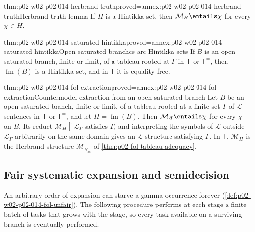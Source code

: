 \begin{hblemma}{thm:p02-w02-p02-014-herbrand-truth}{proved=annex:p02-w02-p02-014-herbrand-truth}{Herbrand truth lemma}
If \(H\) is a Hintikka set, then \(\mathcal M_H\entails\chi\) for every
\(\chi\in H\).
\end{hblemma}

\begin{hblemma}{thm:p02-w02-p02-014-saturated-hintikka}{proved=annex:p02-w02-p02-014-saturated-hintikka}{Open saturated branches are Hintikka sets}
If \(B\) is an open saturated branch, finite or limit, of a tableau rooted at
\(\Gamma\) in \(\mathsf T\) or \(\mathsf T^{=}\), then \(\operatorname{fm}(B)\) is a Hintikka
set, and in \(\mathsf T\) it is equality-free.
\end{hblemma}

\begin{hbtheorem}{thm:p02-w02-p02-014-fol-extraction}{proved=annex:p02-w02-p02-014-fol-extraction}{Countermodel extraction from an open saturated branch}
Let \(B\) be an open saturated branch, finite or limit, of a tableau rooted
at a finite set \(\Gamma\) of \(\mathcal L\)-sentences in \(\mathsf T\) or
\(\mathsf T^{=}\), and let \(H=\operatorname{fm}(B)\).  Then
\(\mathcal M_H\entails\chi\) for every \(\chi\) on \(B\).  Its reduct
\(\mathcal M_H\restriction\mathcal L_{\Gamma}\) satisfies \(\Gamma\), and
interpreting the symbols of \(\mathcal L\) outside \(\mathcal L_{\Gamma}\)
arbitrarily on the same domain gives an \(\mathcal L\)-structure satisfying
\(\Gamma\).  In \(\mathsf T\), \(\mathcal M_H\) is the Herbrand structure
\(\mathcal M_{B^{+}_{\mathrm{at}}}\) of
\cref{thm:p02-fol-tableau-adequacy}.
\end{hbtheorem}

\subsection{Fair systematic expansion and semidecision}
\label{sec:p02-w02-p02-014-fol-systematic}

An arbitrary order of expansion can starve a gamma occurrence forever
(\cref{def:p02-w02-p02-014-fol-unfair}).  The following procedure performs
at each stage a finite batch of tasks that grows with the stage, so every
task available on a surviving branch is eventually performed.

